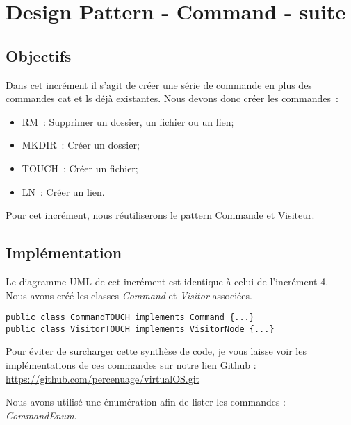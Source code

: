 \newpage
\section{Design Pattern - Command - suite}

\subsection{Objectifs}

Dans cet incrément il s’agit de créer une série de commande en plus des commandes cat et ls déjà existantes.  Nous devons donc créer les commandes :\\
\begin{itemize}
\item RM : Supprimer un dossier, un fichier ou un lien;
\item MKDIR : Créer un dossier;
\item TOUCH : Créer un fichier;
\item LN : Créer un lien.\\
\end{itemize}

Pour cet incrément, nous réutiliserons le pattern Commande et Visiteur.

\subsection{Implémentation}

Le diagramme UML de cet incrément est identique à celui de l'incrément 4.\\

Nous avons créé les classes \emph{Command} et \emph{Visitor} associées.

\begin{lstlisting}
public class CommandTOUCH implements Command {...}
public class VisitorTOUCH implements VisitorNode {...}
\end{lstlisting}

Pour éviter de surcharger cette synthèse de code, je vous laisse voir les implémentations de ces commandes sur notre lien Github : \url{https://github.com/percenuage/virtualOS.git}

Nous avons utilisé une énumération afin de lister les commandes : \emph{CommandEnum}.

